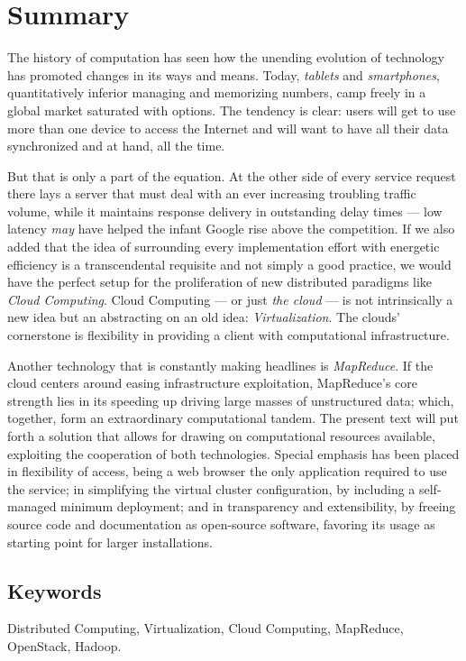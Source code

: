 \chapter*{Summary}
\noindent The history of computation has seen how the unending evolution of technology has promoted changes in its ways and means. Today, \textit{tablets} and \textit{smartphones}, quantitatively inferior managing and memorizing numbers, camp freely in a global market saturated with options. The tendency is clear: users will get to use more than one device to access the Internet and will want to have all their data synchronized and at hand, all the time.

But that is only a part of the equation. At the other side of every service request there lays a server that must deal with an ever increasing troubling traffic volume, while it maintains response delivery in outstanding delay times --- low latency \emph{may} have helped the infant Google rise above the competition. If we also added that the idea of surrounding every implementation effort with energetic efficiency is a transcendental requisite and not simply a good practice, we would have the perfect setup for the proliferation of new distributed paradigms like \emph{Cloud Computing}. Cloud Computing --- or just \emph{the cloud} --- is not intrinsically a new idea but an abstracting on an old idea: \emph{Virtualization}. The clouds' cornerstone is flexibility in providing a client with computational infrastructure.

Another technology that is constantly making headlines is \emph{MapReduce}. If the cloud centers around easing infrastructure exploitation, MapReduce's core strength lies in its speeding up driving large masses of unstructured data; which, together, form an extraordinary computational tandem. The present text will put forth a solution that allows for drawing on computational resources available, exploiting the cooperation of both technologies. Special emphasis has been placed in flexibility of access, being a web browser the only application required to use the service; in simplifying the virtual cluster configuration, by including a self-managed minimum deployment; and in transparency and extensibility, by freeing source code and documentation as open-source software, favoring its usage as starting point for larger installations.

\section*{Keywords}
\noindent Distributed Computing, Virtualization, Cloud Computing, MapReduce, OpenStack, Hadoop.
